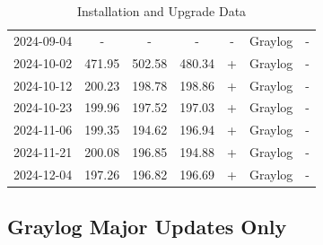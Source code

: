 \documentclass[../main.tex]{subfiles}
\begin{document}
\begin{table}[H]
\begin{tabular}{|c|c|c|c|c|c|c|}
        2024-09-04 & - & - & - & - & Graylog & - \\
        2024-10-02 & 471.95 & 502.58 & 480.34 & + & Graylog & - \\
        2024-10-12 & 200.23 & 198.78 & 198.86 & + & Graylog & - \\
        2024-10-23 & 199.96 & 197.52 & 197.03 & + & Graylog & - \\
        2024-11-06 & 199.35 & 194.62 & 196.94 & + & Graylog & - \\
        2024-11-21 & 200.08 & 196.85 & 194.88 & + & Graylog & - \\
        2024-12-04 & 197.26 & 196.82 & 196.69 & + & Graylog & - \\
                \hline
    \end{tabular}
    \caption{Installation and Upgrade Data}
    \label{tab:graylog_results_2024}
\end{table}

\subsection{Graylog Major Updates Only}
\end{document}
